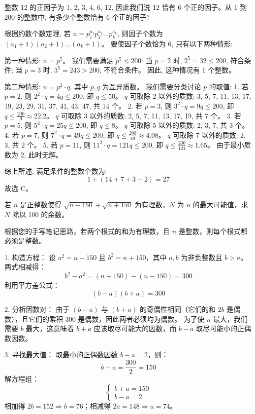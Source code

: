 \begin{questions}
\question 整数 12 的正因子为 1, 2, 3, 4, 6, 12, 因此我们说 12 恰有 6 个正的因子。从 1 到 200 的整数中, 有多少个整数恰有 6 个正的因子?

\begin{solution}
根据约数个数定理, 若 $n = p_1^{a_1} p_2^{a_2} \dots p_k^{a_k}$, 则因子个数为 $(a_1 + 1)(a_2 + 1) \dots (a_k + 1)$。
要使因子个数恰为 6, 只有以下两种情形:

第一种情形: $n = p^5$。
我们需要满足 $p^5 \leq 200$:
当 $p = 2$ 时, $2^5 = 32 \leq 200$, 符合条件;
当 $p = 3$ 时, $3^5 = 243 > 200$, 不符合条件。
因此, 这种情况有 1 个整数。

第二种情形: $n = p^2 \cdot q$, 其中 $p, q$ 为互异质数。
我们需要分类讨论 $p$ 的取值:
1. 若 $p = 2$, 则 $2^2 \cdot q = 4q \leq 200$, 即 $q \leq 50$。
$q$ 可取除 2 以外的质数: 3, 5, 7, 11, 13, 17, 19, 23, 29, 31, 37, 41, 43, 47, 共 14 个。
2. 若 $p = 3$, 则 $3^2 \cdot q = 9q \leq 200$, 即 $q \leq \frac{200}{9} \approx 22.2$。
$q$ 可取除 3 以外的质数: 2, 5, 7, 11, 13, 17, 19, 共 7 个。
3. 若 $p = 5$, 则 $5^2 \cdot q = 25q \leq 200$, 即 $q \leq 8$。
$q$ 可取除 5 以外的质数: 2, 3, 7, 共 3 个。
4. 若 $p = 7$, 则 $7^2 \cdot q = 49q \leq 200$, 即 $q \leq \frac{200}{49} \approx 4.08$。
$q$ 可取除 7 以外的质数: 2, 3, 共 2 个。
5. 若 $p = 11$, 则 $11^2 \cdot q = 121q \leq 200$, 即 $q \leq \frac{200}{121} \approx 1.65$。
由于最小质数为 2, 此时无解。

综上所述, 满足条件的整数个数为:
\[
1 + (14 + 7 + 3 + 2) = 27
\]
故选 C。
\end{solution}

\question 若 $n$ 是正整数使得 $\sqrt{n-150} + \sqrt{n+150}$ 为有理数，$N$ 为 $n$ 的最大可能值，求 $N$ 除以 100 的余数。
\begin{solution}
根据您的手写笔记思路，若两个根式的和为有理数，且 $n$ 是整数，则每个根式都必须是整数。

1. 构造方程：
   设 $a^2 = n - 150$ 且 $b^2 = n + 150$，其中 $a, b$ 为非负整数且 $b > a$。
   两式相减得：
   \[ b^2 - a^2 = (n + 150) - (n - 150) = 300 \]
   利用平方差公式：
   \[ (b - a)(b + a) = 300 \]

2. 分析因数对：
   由于 $(b - a)$ 与 $(b + a)$ 的奇偶性相同（它们的和 $2b$ 是偶数），且它们的乘积 300 是偶数，因此两者必须均为偶数。
   为了使 $n$ 最大，我们需要 $b$ 最大，这意味着 $b + a$ 应该取尽可能大的因数，而 $b - a$ 取尽可能小的正偶数因数。

3. 寻找最大值：
   取最小的正偶数因数 $b - a = 2$，则：
   \[ b + a = \frac{300}{2} = 150 \]
   解方程组：
   \[
   \begin{cases}
   b + a = 150 \\
   b - a = 2
   \end{cases}
   \]
   相加得 $2b = 152 \Rightarrow b = 76$；相减得 $2a = 148 \Rightarrow a = 74$。


\end{solution}
\end{questions}
